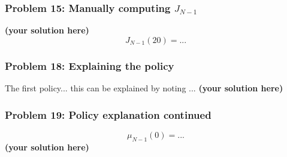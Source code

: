 \documentclass[12pt,twoside]{article}
\newcommand\redt[1]{ {\textcolor[rgb]{0.60, 0.00, 0.00}{\textbf{ #1} } } }
\newcommand{\yoursolution}{ \redt{(your solution here) } }
\begin{document}
\subsubsection*{{\color{red}Problem 15:  Manually computing $J_{N-1}$}}
		
	\yoursolution 	
	$$
	J_{N-1}(20)  = ...
	$$
	
\subsubsection*{{\color{red}Problem 18:  Explaining the policy}}

					The first policy... this can be explained by noting ... \yoursolution 

\subsubsection*{{\color{red}Problem 19:  Policy explanation continued}}
	
	$$\mu_{N-1}(0) = ...$$
\yoursolution 		
\end{document}
